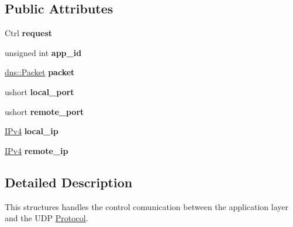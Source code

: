\subsection*{Public Attributes}
\begin{DoxyCompactItemize}
\item 
Ctrl {\bfseries request}\hypertarget{structudp_1_1Control_a2aa019b350db9c5f2d66f20772d9b79b}{}\label{structudp_1_1Control_a2aa019b350db9c5f2d66f20772d9b79b}

\item 
unsigned int {\bfseries app\+\_\+id}\hypertarget{structudp_1_1Control_af8d12ad139541466d82bd99d79e3be42}{}\label{structudp_1_1Control_af8d12ad139541466d82bd99d79e3be42}

\item 
\hyperlink{structdns_1_1Packet}{dns\+::\+Packet} {\bfseries packet}\hypertarget{structudp_1_1Control_afb69653a07aa874b2c6be07621744c9d}{}\label{structudp_1_1Control_afb69653a07aa874b2c6be07621744c9d}

\item 
ushort {\bfseries local\+\_\+port}\hypertarget{structudp_1_1Control_a4f07eed648f80d37385c12a0b5b803f8}{}\label{structudp_1_1Control_a4f07eed648f80d37385c12a0b5b803f8}

\item 
ushort {\bfseries remote\+\_\+port}\hypertarget{structudp_1_1Control_a03d29c28ed03e44e4db2df155f638b3e}{}\label{structudp_1_1Control_a03d29c28ed03e44e4db2df155f638b3e}

\item 
\hyperlink{structIPv4}{I\+Pv4} {\bfseries local\+\_\+ip}\hypertarget{structudp_1_1Control_a3f31765e13cd17a0c2661754971db196}{}\label{structudp_1_1Control_a3f31765e13cd17a0c2661754971db196}

\item 
\hyperlink{structIPv4}{I\+Pv4} {\bfseries remote\+\_\+ip}\hypertarget{structudp_1_1Control_ae07465d93c71c8ed4a74d8c523c6f054}{}\label{structudp_1_1Control_ae07465d93c71c8ed4a74d8c523c6f054}

\end{DoxyCompactItemize}


\subsection{Detailed Description}
This structures handles the control comunication between the application layer and the U\+DP \hyperlink{classProtocol}{Protocol}. 

